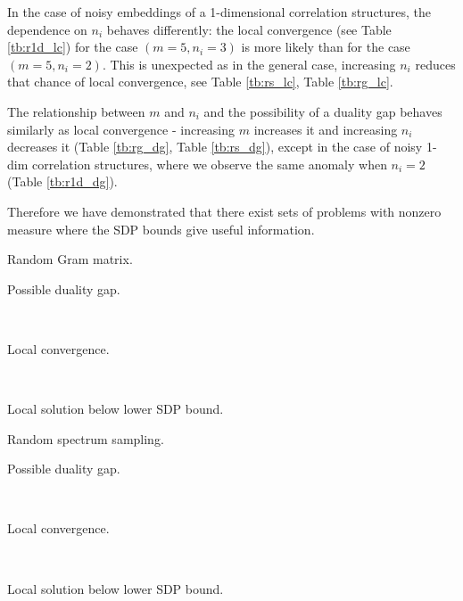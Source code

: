 In the case of noisy embeddings of a 1-dimensional correlation structures, the dependence on $n_i$
behaves differently: the local convergence (see Table \ref{tb:r1d_lc}) for the
case $\left(m=5, n_i=3\right)$ is more likely than for the
case $\left(m=5, n_i =2\right)$. This is unexpected as in the general case,
increasing $n_i$ reduces that chance of local convergence,
see Table \ref{tb:rs_lc}, Table \ref{tb:rg_lc}.

The relationship between $m$ and $n_i$ and the possibility of a
duality gap behaves similarly as local convergence -
increasing $m$ increases it and increasing $n_i$ decreases it (Table \ref{tb:rg_dg}, Table \ref{tb:rs_dg}),
except in the case of noisy 1-dim correlation structures, where
we observe the same anomaly when $n_i = 2$ (Table \ref{tb:r1d_dg}).

Therefore we have demonstrated that there exist sets of problems with nonzero
measure where the SDP bounds give useful information.

\begin{table}[t]
\caption{Random Gram matrix.}
    \begin{subtable}[t]{.5\textwidth}
        \centering
        \caption{Possible duality gap.}
                
        \label{tb:rg_dg}
    \end{subtable}
    ~
    \begin{subtable}[t]{.5\textwidth}
        \centering
        \caption{Local convergence.}
                
        \label{tb:rg_lc}
    \end{subtable}
    ~
    \begin{subtable}[t]{\textwidth}
        \centering
        \caption{Local solution below lower SDP bound.}
                
        \label{tb:rg_lb}
    \end{subtable}  
  \label{tb:rg}
\end{table}

\begin{table}[t]
  \caption{Random spectrum sampling.}
    \begin{subtable}[t]{.5\textwidth}
        \centering
        \caption{Possible duality gap.}
        
        \label{tb:rs_dg}
    \end{subtable}
    ~
    \begin{subtable}[t]{.5\textwidth}
        \centering
        \caption{Local convergence.}
        
        \label{tb:rs_lc}
    \end{subtable}
    ~
    \begin{subtable}[t]{\textwidth}
        \centering
        \caption{Local solution below lower SDP bound.}
        
        \label{tb:rs_lb}
    \end{subtable}
  \label{tb:rs}
\end{table}

